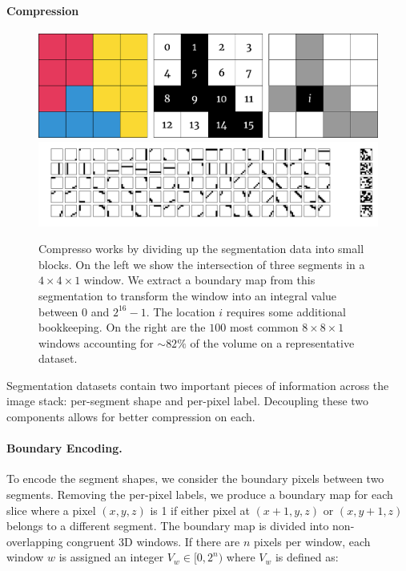 \paragraph{Compression}

\begin{figure}[t]
	\begin{center}
		\includegraphics[width=0.45\linewidth]{./figures/encoding_diagram_opt.pdf}
		\hspace{0.08\linewidth}
		\includegraphics[width=0.45\linewidth]{./figures/window_values.pdf}
	\end{center}	
	\caption{Compresso works by dividing up the segmentation data into small blocks. On the left we show the intersection of three segments in a $4\times4\times1$ window. We extract a boundary map from this segmentation to transform the window into an integral value between $0$ and $2^{16} - 1$. The location $i$ requires some additional bookkeeping. On the right are the $100$ most common $8 \times 8 \times 1$ windows accounting for $\sim82\%$ of the volume on a representative dataset.}
	\label{fig:compression}
\end{figure}

Segmentation datasets contain two important pieces of information across the image stack: per-segment shape and per-pixel label. 
Decoupling these two components allows for better compression on each.

\paragraph{Boundary Encoding.}
\label{sec:boundary-map}

To encode the segment shapes, we consider the boundary pixels between two segments. 
Removing the per-pixel labels, we produce a boundary map for each slice where a pixel $(x, y, z)$ is 1 if either pixel at $(x + 1, y, z)$ or $(x, y + 1, z)$ belongs to a different segment. 
The boundary map is divided into non-overlapping congruent 3D windows. If there are $n$ pixels per window, each window $w$ is assigned an integer $V_w \in [0, 2^n)$ where $V_w$ is defined as:

